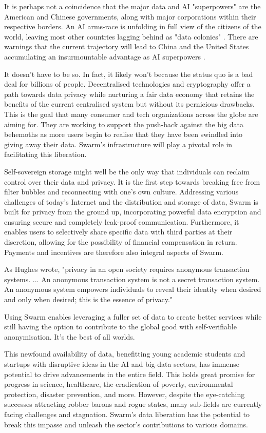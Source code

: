 It is perhaps not a coincidence that the major data and AI "superpowers" are the American and Chinese governments, along with major corporations within their respective borders. An AI arms-race is unfolding in full view of the citizens of the world,  leaving most other countries lagging behind as "data colonies" \cite{HarariDavos2020Mar}. There are warnings that the current trajectory will lead to China and the United States accumulating an insurmountable advantage as AI superpowers \cite{Lee2018Sep}.

It doesn't have to be so. In fact, it likely won't because the status quo is a bad deal for billions of people. Decentralised technologies and cryptography offer a path towards data privacy while nurturing a fair data economy that retains the benefits of the current centralised system but without its pernicious drawbacks. This is the goal that many consumer and tech organizations across the globe are aiming for. They are working to support the push-back against the big data behemoths as more users begin to realise that they have been swindled into giving away their data. Swarm's infrastructure will play a pivotal role in facilitating this liberation.

Self-sovereign storage might well be the only way that individuals can reclaim control over their data and privacy. It is the first step towards breaking free from filter bubbles and reconnecting with one's own culture. Addressing various challenges of today's Internet and the distribution and storage of data, Swarm is built for privacy from the ground up, incorporating powerful data encryption and ensuring secure and completely leak-proof communication. Furthermore, it enables users to selectively share specific data with third parties at their discretion, allowing for the possibility of financial compensation in return. Payments and incentives are therefore also integral aspects of Swarm.

As Hughes wrote, "privacy in an open society requires anonymous transaction systems. ... An anonymous transaction system is not a secret transaction system. An anonymous system empowers individuals to reveal their identity when desired and only when desired; this is the essence of privacy."

Using Swarm enables leveraging a fuller set of data to create better services while still having the option to contribute to the global good with self-verifiable anonymisation. It's the best of all worlds.

This newfound availability of data, benefitting young academic students and startups with disruptive ideas in the AI and big-data sectors, has immense potential to drive advancements in the entire field. This holds great promise for progress in science, healthcare, the eradication of poverty, environmental protection, disaster prevention, and more. However, despite the eye-catching successes attracting robber barons and rogue states, many sub-fields are currently facing challenges and stagnation. Swarm's data liberation has the potential to break this impasse  and unleash the sector's contributions to various domains. 

